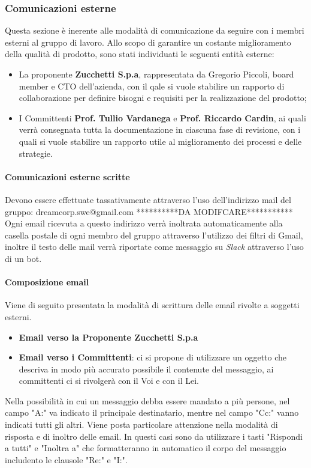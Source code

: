         \subsubsection{Comunicazioni esterne}
            Questa sezione è inerente alle modalità di comunicazione da seguire con i membri esterni al gruppo di lavoro.
            \newline
            Allo scopo di garantire un costante miglioramento della qualità di prodotto, sono stati individuati le seguenti entità esterne:
            \begin{itemize}
                \item La proponente \textbf{Zucchetti S.p.a}, rappresentata da Gregorio Piccoli, board member e CTO dell'azienda, con il qale si vuole stabilire un rapporto di collaborazione per definire bisogni e requisiti per la realizzazione del prodotto;
                \item I Committenti \textbf{Prof. Tullio Vardanega} e \textbf{Prof. Riccardo Cardin}, ai quali verrà consegnata tutta la documentazione in ciascuna fase di revisione, con i quali si vuole stabilire un rapporto utile al miglioramento dei processi e delle strategie.
            \end{itemize}
            \paragraph{Comunicazioni esterne scritte} Devono essere effettuate tassativamente attraverso l'uso dell'indirizzo mail del gruppo:
            \newline
            dreamcorp.swe@gmail.com   **********DA MODIFCARE***********
            \newline
            Ogni email ricevuta a questo indirizzo verrà inoltrata automaticamente alla casella postale di ogni membro del gruppo attraverso l'utilizzo dei filtri di Gmail, inoltre il testo delle mail verrà riportate come messaggio su \textit{Slack} attraverso l'uso di un bot.
            \paragraph{Composizione email}
            Viene di seguito presentata la modalità di scrittura delle email rivolte a soggetti esterni.
            \begin{itemize}
                \item \textbf{Email verso la Proponente Zucchetti S.p.a} 
                \item \textbf{Email verso i Committenti}: ci si propone di utilizzare un oggetto che descriva in modo più accurato possibile il contenute del messaggio, ai committenti ci si rivolgerà con il Voi e con il Lei.
            \end{itemize}
            Nella possibilità in cui un messaggio debba essere mandato a più persone, nel campo "A:" va indicato il principale destinatario, mentre nel campo "Cc:" vanno indicati tutti gli altri.
            Viene posta particolare attenzione nella modalità di risposta e di inoltro delle email. In questi casi sono da utilizzare i tasti "Rispondi a tutti" e "Inoltra a" che formatteranno in automatico il corpo del messaggio includento le clausole "Re:" e "I:".
